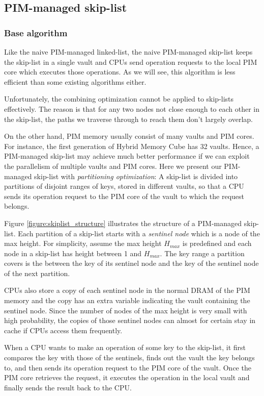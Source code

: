 \subsection{PIM-managed skip-list}
\label{section:skip_list}

\subsubsection{Base algorithm}
Like the naive PIM-managed linked-list,
the naive PIM-managed skip-list keeps the skip-list in a single vault and
CPUs send operation requests to the local PIM core which executes those operations.
As we will see, this algorithm is less efficient than some existing algorithms either.

Unfortunately, the combining optimization cannot be applied to skip-lists effectively.
The reason is that for any two nodes not close enough to each other in the skip-list,
the paths we traverse through to reach them don't largely overlap.

On the other hand, PIM memory usually consist of many vaults and PIM cores.
For instance, the first generation of Hybrid Memory Cube \cite{website:HMC} has 32 vaults.
Hence, a PIM-managed skip-list may achieve much better performance if
we can exploit the parallelism of multiple vaults and PIM cores.
Here we present our PIM-managed skip-list with \emph{partitioning optimization}:
A skip-list is divided into partitions of disjoint ranges of keys,
stored in different vaults, so that a CPU sends its operation request to
the PIM core of the vault to which the request belongs.

Figure \ref{figure:skiplist_structure} illustrates the structure of a PIM-managed skip-list.
Each partition of a skip-list starts with a \emph{sentinel node}
which is a node of the max height. For simplicity, assume the max height $H_{max}$ 
is predefined and each node in a skip-list has height between 1 and $H_{max}$.
The key range a partition covers is the between the key of its sentinel node and
the key of the sentinel node of the next partition.

CPUs also store a copy of each sentinel node in the normal DRAM of the PIM memory 
and the copy has an extra variable indicating the vault containing the sentinel node.
Since the number of nodes of the max height is very small with high probability, 
the copies of those sentinel nodes can almost for certain stay in cache
if CPUs access them frequently.

When a CPU wants to make an operation of some key to the skip-list,
it first compares the key with those of the sentinels, finds out the vault
the key belongs to, and then sends its operation request to
the PIM core of the vault.
Once the PIM core retrieves the request, it executes the operation in the local vault 
and finally sends the result back to the CPU.



